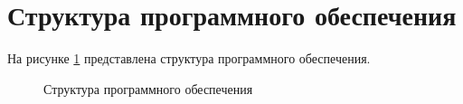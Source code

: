\clearpage

\section{Структура программного обеспечения}

На рисунке \ref{fig:struct} представлена структура программного обеспечения.

\begin{figure}[ph!]
	\caption{Структура программного обеспечения}
	\label{fig:struct}
\end{figure}



